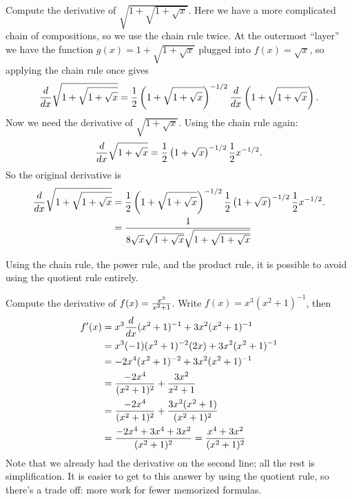 \begin{example}
Compute the derivative of $\sqrt{1+\sqrt{1+\sqrt{x}}}$. Here we have a
more complicated chain of compositions, so we use the chain rule
twice.
At the outermost ``layer'' we have the function
$g(x)=1+\sqrt{1+\sqrt{x}}$ plugged into $f(x)=\sqrt{x}$, so applying
the chain rule once gives 
$${d\over dx}\sqrt{1+\sqrt{1+\sqrt{x}}}=
{1\over 2}\left(1+\sqrt{1+\sqrt{x}}\right)^{-1/2}{d\over dx}
\left(1+\sqrt{1+\sqrt{x}}\right).$$
Now we need the derivative of $\sqrt{1+\sqrt{x}}$. Using the chain
rule again:
$${d\over dx}\sqrt{1+\sqrt{x}}={1\over
  2}\left(1+\sqrt{x}\right)^{-1/2}{1\over 2}x^{-1/2}.$$
So the original derivative is 
\begin{align*}
{d\over dx}\sqrt{1+\sqrt{1+\sqrt{x}}}&=
{1\over 2}\left(1+\sqrt{1+\sqrt{x}}\right)^{-1/2}
{1\over
  2}\left(1+\sqrt{x}\right)^{-1/2}{1\over 2}x^{-1/2}. \\
&={1\over 8 \sqrt{x}\sqrt{1+\sqrt{x}}\sqrt{1+\sqrt{1+\sqrt{x}}}}
\end{align*}
\vskip -16pt
\end{example}

Using the chain rule, the power rule, and the product rule, it is
possible to avoid using the quotient rule entirely.

\begin{example}
Compute the derivative of $f(x)={x^3\over x^2+1}$. Write 
$f(x)=x^3(x^2+1)^{-1}$, then
\begin{align*}
f'(x)&=x^3{d\over dx}(x^2+1)^{-1}+3x^2(x^2+1)^{-1} \\
&=x^3(-1)(x^2+1)^{-2}(2x)+3x^2(x^2+1)^{-1} \\
&=-2x^4(x^2+1)^{-2}+3x^2(x^2+1)^{-1} \\
&={-2x^4\over (x^2+1)^{2}}+{3x^2\over x^2+1} \\
&={-2x^4\over (x^2+1)^{2}}+{3x^2(x^2+1)\over (x^2+1)^{2}} \\
&={-2x^4+3x^4+3x^2\over (x^2+1)^{2}}={x^4+3x^2\over (x^2+1)^{2}} \\
\end{align*}
Note that we already had the derivative on the second line; all the
rest is simplification. It is easier to get to this answer by using
the quotient rule, so there's a trade off: more work for fewer
memorized formulas.
\end{example}


